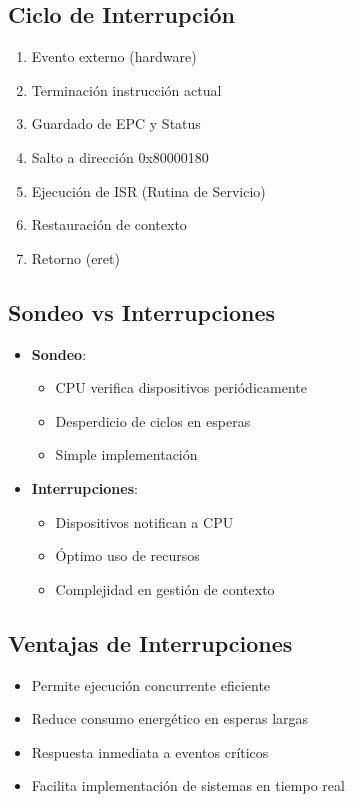 \documentclass[12pt, a4paper]{article}
\begin{document}
\subsection{Ciclo de Interrupción}
\begin{enumerate}
    \item Evento externo (hardware)
    \item Terminación instrucción actual
    \item Guardado de EPC y Status
    \item Salto a dirección 0x80000180
    \item Ejecución de ISR (Rutina de Servicio)
    \item Restauración de contexto
    \item Retorno (eret)
\end{enumerate}

\subsection{Sondeo vs Interrupciones}
\begin{itemize}
    \item \textbf{Sondeo}: 
        \begin{itemize}
            \item CPU verifica dispositivos periódicamente
            \item Desperdicio de ciclos en esperas
            \item Simple implementación
        \end{itemize}
    \item \textbf{Interrupciones}:
        \begin{itemize}
            \item Dispositivos notifican a CPU
            \item Óptimo uso de recursos
            \item Complejidad en gestión de contexto
        \end{itemize}
\end{itemize}

\subsection{Ventajas de Interrupciones}
\begin{itemize}
    \item Permite ejecución concurrente eficiente
    \item Reduce consumo energético en esperas largas
    \item Respuesta inmediata a eventos críticos
    \item Facilita implementación de sistemas en tiempo real
\end{itemize}
\end{document}
